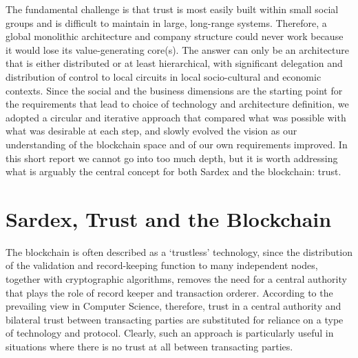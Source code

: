 The fundamental challenge is that trust is most easily built within small social groups and is difficult to maintain in large, long-range systems. Therefore, a global monolithic architecture and company structure could never work because it would lose its value-generating core(s). The answer can only be an architecture that is either distributed or at least hierarchical, with significant delegation and distribution of control to local circuits in local socio-cultural and economic contexts. Since the social and the business dimensions are the starting point for the requirements that lead to choice of technology and architecture definition, we adopted a circular and iterative approach that compared what was possible with what was desirable at each step, and slowly evolved the vision as our understanding of the blockchain space and of our own requirements improved. In this short report we cannot go into too much depth, but it is worth addressing what is arguably the central concept for both Sardex and the blockchain: trust.

\section{Sardex, Trust and the Blockchain}
The blockchain is often described as a `trustless' technology, since the distribution of the validation and record-keeping function to many independent nodes, together with cryptographic algorithms, removes the need for a central authority that plays the role of record keeper and transaction orderer. According to the prevailing view in Computer Science, therefore, trust in a central authority and bilateral trust between transacting parties are substituted for reliance on a type of technology and protocol. Clearly, such an approach is particularly useful in situations where there is no trust at all between transacting parties.

